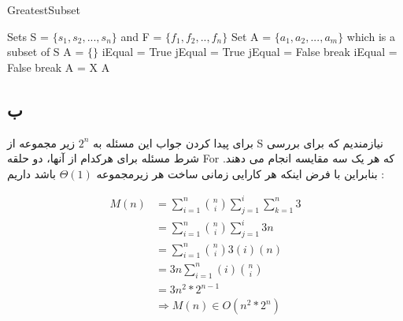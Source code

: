 \documentclass{article}
\begin{document}
\begin{latin}
    \begin{algorithm}
        \caption{GreatestSubset}
        \begin{algorithmic}
            \Require Sets S = $\{s_1, s_2, ..., s_n\}$ and F = $\{ f_1, f_2, .., f_n\}$
            \Ensure Set A = $\{a_1, a_2, ..., a_m\}$ which is a subset of S
            \State A = $\{\}$
                    \State iEqual = True
                        \State jEqual = True
                                \State jEqual = False
                                \State break
                            \EndIf
                        \EndFor
                            \State iEqual = False
                            \State break
                        \EndIf
                    \EndFor
                        \State A = X
                    \EndIf
                \EndIf
            \EndFor
            \Return A
        \end{algorithmic}
    \end{algorithm}
\end{latin}
\pagebreak
\subsection{ب}
برای پیدا کردن جواب این مسئله به $2^n$
زیر مجموعه از S
نیازمندیم که برای بررسی شرط مسئله برای هرکدام از آنها، دو حلقه For
که هر یک سه مقایسه انجام می دهند. بنابراین با فرض اینکه هر کارایی زمانی ساخت هر زیرمجموعه
$\Theta(1)$
باشد داریم :

\begin{align}
    M(n) &= \sum_{i=1}^{n} {\binom{n}{i}} \sum_{j=1}^{i} \sum_{k=1}^{n} 3 \\
    &= \sum_{i=1}^{n} {\binom{n}{i}} \sum_{j=1}^{i} 3n \\
    &= \sum_{i=1}^{n} {\binom{n}{i}} 3(i)(n) \\
    &= {3n}\sum_{i=1}^{n} { (i) \binom{n}{i}} \\
    &= 3n^2 * 2^{n-1} \\
    &\Rightarrow M(n) \in O(n^2*2^n)
\end{align}

\pagebreak
\end{document}
